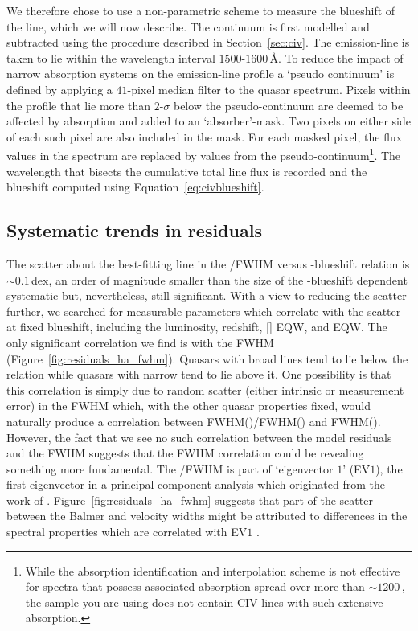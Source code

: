 We therefore chose to use a non-parametric scheme to measure the blueshift of the  line, which we will now describe. 
The continuum is first modelled and subtracted using the procedure described in Section~\ref{sec:civ}. 
The  emission-line is taken to lie within the wavelength interval $1500$-$1600$\,\AA. 
To reduce the impact of narrow absorption systems on the emission-line profile a `pseudo continuum' is defined by applying a $41$-pixel median filter to the quasar spectrum.
Pixels within the  profile that lie more than $2$-$\sigma$ below the pseudo-continuum are deemed to be affected by absorption and added to an `absorber'-mask. 
Two pixels on either side of each such pixel are also included in the mask. 
For each masked pixel, the flux values in the spectrum are replaced by values from the pseudo-continuum\footnote{While the absorption identification and interpolation scheme is not effective for spectra that possess
associated absorption spread over more than $\sim1200$\,\kms, the sample you are using does
not contain CIV-lines with such extensive absorption. }. 
The wavelength that bisects the cumulative total line flux is recorded and the blueshift computed using Equation~\ref{eq:civblueshift}. 

\subsection{Systematic trends in residuals}
\label{sec:ch3-residuals}

The scatter about the best-fitting line in the /\ha FWHM versus -blueshift relation is $\sim0.1$\,dex, an order of magnitude smaller than the size of the -blueshift dependent systematic but, nevertheless, still significant.
With a view to reducing the scatter further, we searched for measurable parameters which correlate with the scatter at fixed  blueshift, including the luminosity, redshift, [] EQW, and  EQW.
The only significant correlation we find is with the \ha FWHM (Figure~\ref{fig:residuals_ha_fwhm}).
Quasars with broad \ha lines tend to lie below the relation while quasars with narrow \ha tend to lie above it.
One possibility is that this correlation is simply due to random scatter (either intrinsic or measurement error) in the \ha FWHM which, with the other quasar properties fixed, would naturally produce a correlation between FWHM()/FWHM(\hans) and FWHM(\hans).
However, the fact that we see no such correlation between the model residuals and the  FWHM suggests that the \ha FWHM correlation could be revealing something more fundamental. 
The \hans/\hb FWHM is part of `eigenvector $1$' (EV$1$), the first eigenvector in a principal component analysis which originated from the work of \citet{boroson92}.    
Figure~\ref{fig:residuals_ha_fwhm} suggests that part of the scatter between the Balmer and  velocity widths might be attributed to differences in the spectral properties which are correlated with EV$1$ \citep{marziani13}. 


